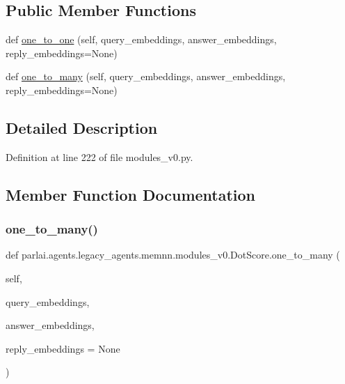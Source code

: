 \subsection*{Public Member Functions}
\begin{DoxyCompactItemize}
\item 
def \hyperlink{classparlai_1_1agents_1_1legacy__agents_1_1memnn_1_1modules__v0_1_1DotScore_acf84cd9ea66c02103aae3b3ddb78c59e}{one\+\_\+to\+\_\+one} (self, query\+\_\+embeddings, answer\+\_\+embeddings, reply\+\_\+embeddings=None)
\item 
def \hyperlink{classparlai_1_1agents_1_1legacy__agents_1_1memnn_1_1modules__v0_1_1DotScore_a3ce27eeeca048e948546729199007d35}{one\+\_\+to\+\_\+many} (self, query\+\_\+embeddings, answer\+\_\+embeddings, reply\+\_\+embeddings=None)
\end{DoxyCompactItemize}


\subsection{Detailed Description}


Definition at line 222 of file modules\+\_\+v0.\+py.



\subsection{Member Function Documentation}
\mbox{\label{classparlai_1_1agents_1_1legacy__agents_1_1memnn_1_1modules__v0_1_1DotScore_a3ce27eeeca048e948546729199007d35}} 
\subsubsection{\texorpdfstring{one\+\_\+to\+\_\+many()}{one\_to\_many()}}
{\footnotesize\ttfamily def parlai.\+agents.\+legacy\+\_\+agents.\+memnn.\+modules\+\_\+v0.\+Dot\+Score.\+one\+\_\+to\+\_\+many (\begin{DoxyParamCaption}\item[{}]{self,  }\item[{}]{query\+\_\+embeddings,  }\item[{}]{answer\+\_\+embeddings,  }\item[{}]{reply\+\_\+embeddings = {\ttfamily None} }\end{DoxyParamCaption})}



